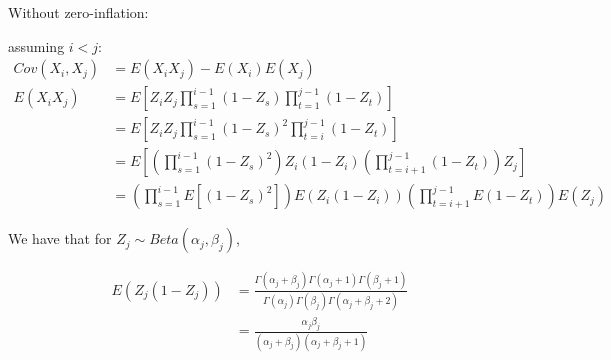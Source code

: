 \documentclass[10pt]{article}
\theoremstyle{definition}
\begin{document}
Without zero-inflation:

assuming $i < j$:
\begin{align*}
  Cov(X_i, X_j) &= E(X_iX_j) - E(X_i)E(X_j)\\
  E(X_iX_j) &= E \left[ Z_iZ_j \prod_{s = 1}^{i-1} (1 - Z_s) \prod_{t = 1}^{j - 1} (1 - Z_t) \right]\\
  &= E \left[ Z_iZ_j \prod_{s = 1}^{i-1} (1 - Z_s)^2 \prod_{t = i}^{j - 1} (1 - Z_t) \right]\\
  &= E \left[ \left(\prod_{s = 1}^{i - 1} (1 - Z_s)^2 \right) Z_i(1 - Z_i) \left(\prod_{t = i + 1}^{j-1}(1 - Z_t) \right) Z_j\right]\\
  &=  \left(\prod_{s = 1}^{i - 1}E \left[ (1 - Z_s)^2 \right]\right) E(Z_i(1 - Z_i)) \left(\prod_{t = i + 1}^{j-1} E(1 - Z_t)\right) E(Z_j)
\end{align*}


We have that for $Z_j \sim Beta(\alpha_j, \beta_j)$,

\begin{align*}
  E(Z_j(1 - Z_j)) &= \frac{\Gamma(\alpha_j + \beta_j)\Gamma(\alpha_j + 1)\Gamma(\beta_j + 1)}{\Gamma(\alpha_j)\Gamma(\beta_j)\Gamma(\alpha_j + \beta_j + 2)}\\
  &= \frac{\alpha_j \beta_j}{(\alpha_j + \beta_j)(\alpha_j + \beta_j + 1)}
\end{align*}
\end{document}
